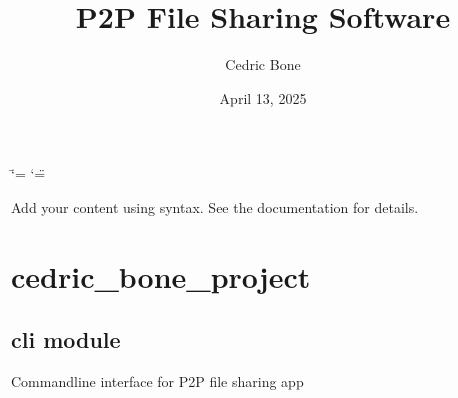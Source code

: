 \documentclass[letterpaper,10pt,english]{sphinxmanual}
\title{P2P File Sharing Software}
\date{April 13, 2025}
\author{Cedric Bone}
\begin{document}
\ifdefined\shorthandoff
  \ifnum\catcode`\=\string=\active\shorthandoff{=}\fi
  \ifnum\catcode`\"=\active{}\fi
\fi

\pagestyle{empty}
\sphinxmaketitle
\pagestyle{plain}
\sphinxtableofcontents
\pagestyle{normal}
\label{\detokenize{index::doc}}


\sphinxAtStartPar
Add your content using  syntax. See the
documentation for details.

\sphinxstepscope


\chapter{cedric\_bone\_project}
\label{\detokenize{modules:cedric-bone-project}}\label{\detokenize{modules::doc}}
\sphinxstepscope


\section{cli module}
\label{\detokenize{cli:module-cli}}\label{\detokenize{cli:cli-module}}\label{\detokenize{cli::doc}}
\sphinxAtStartPar
Command\sphinxhyphen{}line interface for P2P file sharing app
\end{document}
